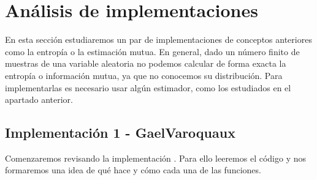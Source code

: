 \documentclass[10pt,a4paper]{article} %
\theoremstyle{definition}
\begin{document}
\section{Análisis de implementaciones}

En esta sección estudiaremos un par de implementaciones de conceptos anteriores como la entropía o la estimación mutua. En general, dado un número finito de muestras de una variable aleatoria no podemos calcular de forma exacta la entropía o información mutua, ya que no conocemos su distribución. Para implementarlas es necesario usar algún estimador, como los estudiados en el apartado anterior.

\subsection{Implementación 1 - GaelVaroquaux}

Comenzaremos revisando la implementación \cite{estimating}. Para ello leeremos el código y nos formaremos una idea de qué hace y cómo cada una de las funciones.
\end{document}
